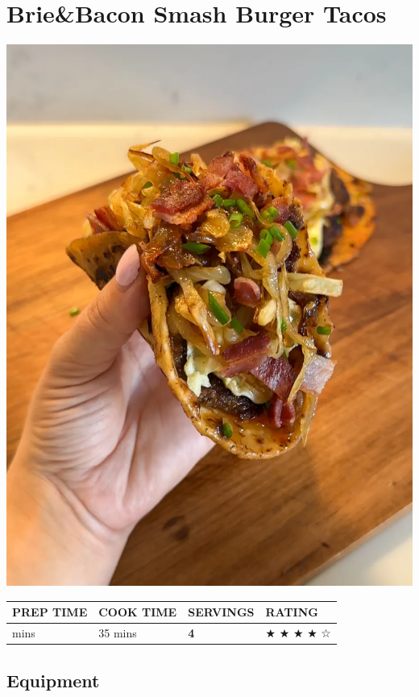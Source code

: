 \documentclass[
]{book}
\begin{document}
\section*{Brie\&Bacon Smash Burger
Tacos}\label{briebacon-smash-burger-tacos}

\includegraphics{bbsb.jpg}

\begin{longtable}[]{@{}llll@{}}
\toprule\noalign{}
\textbf{PREP TIME} & \textbf{COOK TIME} & \textbf{SERVINGS} &
\textbf{RATING} \\
\midrule\noalign{}
\endhead
\bottomrule\noalign{}
\endlastfoot
10 mins & 35 mins & \textbf{4} & ★ ★ ★ ★ ☆ \\
\end{longtable}

\subsection*{Equipment}\label{equipment-5}
\end{document}
